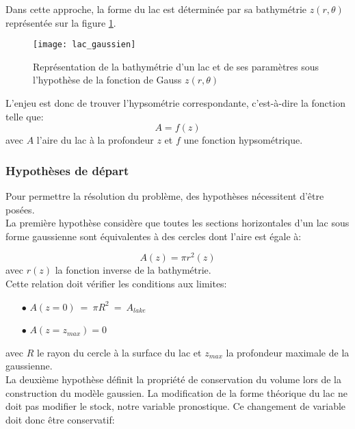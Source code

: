 \noindent Dans cette approche, la forme du lac est déterminée par sa bathymétrie $z(r, \theta)$ représentée sur la figure \ref{lac_gaussien}. 

\begin{figure}[h!]
\centering
\texttt{[image: lac\_gaussien]}
\caption{Représentation de la bathymétrie d'un lac et de ses paramètres sous l'hypothèse de la fonction de Gauss $z(r,\theta)$}
\label{lac_gaussien}
\end{figure}
\clearpage
\noindent L'enjeu est donc de trouver l'hypsométrie correspondante, c'est-à-dire la fonction telle que:
\begin{equation}
A = f(z)
\end{equation}
avec $A$ l'aire du lac à la profondeur $z$ et $f$ une fonction hypsométrique.
\subsubsection*{Hypothèses de départ}

\noindent Pour permettre la résolution du problème, des hypothèses nécessitent d'être posées.\\
La première hypothèse considère que toutes les sections horizontales d'un lac sous forme gaussienne sont équivalentes à des cercles dont l'aire est égale à:

\begin{equation}
\label{hypothese1}
A(z) = \pi r^2(z)
\end{equation}
avec $r(z)$ la fonction inverse de la bathymétrie. \\

\noindent Cette relation doit vérifier les conditions aux limites:

\begin{itemize}
  \item[$\bullet$]  $A(z=0) \: =  \: \pi R^2 \: = \: A_{lake}$\\
  \item[$\bullet$]  $A(z=z_{max}) = 0$
\end{itemize}
avec $R$ le rayon du cercle à la surface du lac et $z_{max}$ la profondeur maximale de la gaussienne. \\

\noindent La deuxième hypothèse définit la propriété de conservation du volume lors de la construction du modèle gaussien. La modification de la forme théorique du lac ne doit pas modifier le stock, notre variable pronostique. Ce changement de variable doit donc être conservatif:

